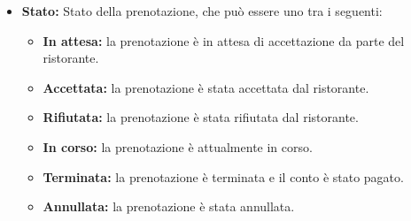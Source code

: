 \begin{itemize}
\begin{itemize}
		      \item \textbf{Stato:} Stato della prenotazione, che può essere uno tra i seguenti:
		            \begin{itemize}
			            \item \textbf{In attesa:} la prenotazione è in attesa di accettazione da parte del ristorante.
						\item \textbf{Accettata:} la prenotazione è stata accettata dal ristorante.
						\item \textbf{Rifiutata:} la prenotazione è stata rifiutata dal ristorante.
						\item \textbf{In corso:} la prenotazione è attualmente in corso.
						\item \textbf{Terminata:} la prenotazione è terminata e il conto è stato pagato.
						\item \textbf{Annullata:} la prenotazione è stata annullata.
		            \end{itemize}
	      \end{itemize}

\end{itemize}
